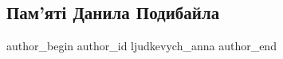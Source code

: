  
 
 
 
 

\subsection{Пам'яті Данила Подибайла}
\label{sec:02_06_2023.fb.ljudkevych_anna.1.pamjati_danyla_podybajlo}

\ifcmt
 author_begin
   author_id ljudkevych_anna
 author_end
\fi


